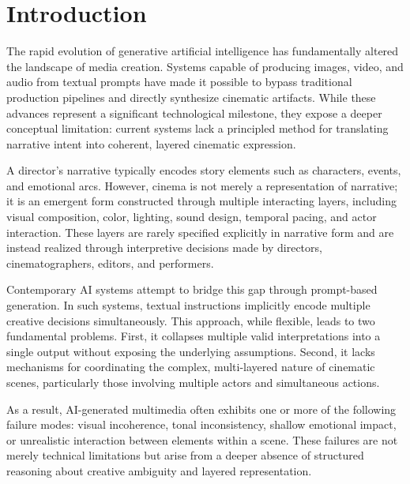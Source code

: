 \documentclass[preprints,article,submit,pdftex,moreauthors,accept]{Definitions/mdpi}
\begin{document}
\nolinenumbers  %

\setcounter{section}{-1} %
\section{Introduction}

The rapid evolution of generative artificial intelligence has fundamentally altered the landscape of media creation. Systems capable of producing images, video, and audio from textual prompts have made it possible to bypass traditional production pipelines and directly synthesize cinematic artifacts. While these advances represent a significant technological milestone, they expose a deeper conceptual limitation: current systems lack a principled method for translating narrative intent into coherent, layered cinematic expression.

A director’s narrative typically encodes story elements such as characters, events, and emotional arcs. However, cinema is not merely a representation of narrative; it is an emergent form constructed through multiple interacting layers, including visual composition, color, lighting, sound design, temporal pacing, and actor interaction. These layers are rarely specified explicitly in narrative form and are instead realized through interpretive decisions made by directors, cinematographers, editors, and performers.

Contemporary AI systems attempt to bridge this gap through prompt-based generation. In such systems, textual instructions implicitly encode multiple creative decisions simultaneously. This approach, while flexible, leads to two fundamental problems. First, it collapses multiple valid interpretations into a single output without exposing the underlying assumptions. Second, it lacks mechanisms for coordinating the complex, multi-layered nature of cinematic scenes, particularly those involving multiple actors and simultaneous actions.

As a result, AI-generated multimedia often exhibits one or more of the following failure modes: visual incoherence, tonal inconsistency, shallow emotional impact, or unrealistic interaction between elements within a scene. These failures are not merely technical limitations but arise from a deeper absence of structured reasoning about creative ambiguity and layered representation.
\end{document}
